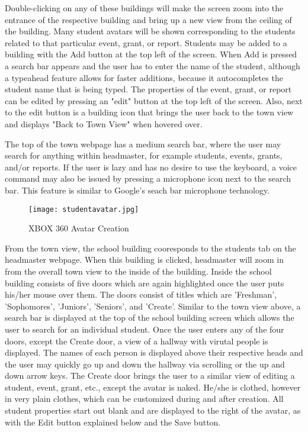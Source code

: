 \documentclass[11pt]{article}
\begin{document}
Double-clicking on any of these buildings will make the screen zoom into the entrance of the respective building and bring up a new view from the ceiling of the building. Many student avatars will be shown corresponding to the students related to that particular event, grant, or report. Students may be added to a building with the Add button at the top left of the screen. When Add is pressed a search bar appears and the user has to enter the name of the student, although a typeahead feature allows for faster additions, because it autocompletes the student name that is being typed. The properties of the event, grant, or report can be edited by pressing an "edit" button at the top left of the screen. Also, next to the edit button is a building icon that brings the user back to the town view and displays "Back to Town View" when hovered over.

 The top of the town webpage has a medium search bar, where the user may search for anything within headmaster, for example students, events, grants, and/or reports. If the user is lazy and has no desire to use the keyboard, a voice command may also be issued by pressing a microphone icon next to the search bar. This feature is similar to Google's seach bar microphone technology. 

\begin{figure}
\centering
\texttt{[image: studentavatar.jpg]}
\caption{XBOX 360 Avatar Creation}
\label{avatar}
\end{figure}

From the town view, the school building cooresponds to the students tab on the headmaster webpage. When this building is clicked, headmaster will zoom in from the overall town view to the inside of the building. Inside the school building consists of five doors which are again highlighted once the user puts his/her mouse over them. The doors consist of titles which are 'Freshman', 'Sophomores', 'Juniors', 'Seniors', and 'Create'. Similar to the town view above, a search bar is displayed at the top of the school building screen which allows the user to search for an individual student. Once the user enters any of the four doors, except the Create door, a view of a hallway with virutal people is displayed. The names of each person is displayed above their respective heads and the user may quickly go up and down the hallway via scrolling or the up and down arrow keys. The Create door brings the user to a similar view of editing a student, event, grant, etc., except the avatar is naked. He/she is clothed, however in very plain clothes, which can be customized during and after creation. All student properties start out blank and are displayed to the right of the avatar, as with the Edit button explained below and the Save button.
\end{document}
